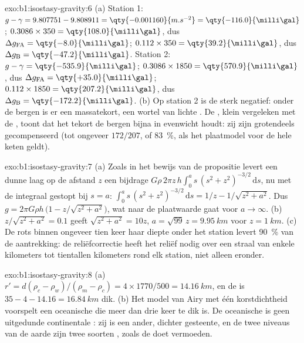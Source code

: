 \begin{solution}{exo:b1:isostasy-gravity:6}
(a) Station 1: $g - \gamma = 9.807751 - 9.808911 = \qty{-0.001160}{m.s^{-2}} =
\qty{-116.0}{\milli\gal}$;  $0.3086\times350 =
\qty{108.0}{\milli\gal}$, dus $\Delta g_{\mathrm{FA}} = \qty{-8.0}{\milli\gal}$;
 $0.112\times350 = \qty{39.2}{\milli\gal}$, dus
$\Delta g_{\mathrm B} = \qty{-47.2}{\milli\gal}$.
Station 2: $g - \gamma = \qty{-535.9}{\milli\gal}$; 
$0.3086\times1850 = \qty{570.9}{\milli\gal}$, dus $\Delta g_{\mathrm{FA}} =
\qty{+35.0}{\milli\gal}$;  $0.112\times1850 =
\qty{207.2}{\milli\gal}$, dus $\Delta g_{\mathrm B} = \qty{-172.2}{\milli\gal}$.
(b) Op station 2 is de  sterk negatief: onder de bergen is er een massatekort, een wortel van lichte . De , klein vergeleken met de , toont dat het tekort de bergen bijna in evenwicht houdt: zij zijn grotendeels gecompenseerd (tot ongeveer $172/207$, of \qty{83}{\percent}, als het plaatmodel voor de hele keten geldt).
\end{solution}

\begin{solution}{exo:b1:isostasy-gravity:7}
(a) Zoals in het bewijs van de propositie levert een dunne laag op de afstand $z$
een bijdrage $G\rho\,2\pi z\,h\int_0^a s\,(s^2 + z^2)^{-3/2}\,\mathrm ds$, nu met de integraal gestopt bij $s = a$:
$\int_0^a s\,(s^2 + z^2)^{-3/2}\,\mathrm ds = 1/z - 1/\sqrt{z^2 + a^2}$. Dus
$g = 2\pi G\rho h\,\bigl(1 - z/\sqrt{z^2 + a^2}\bigr)$, wat naar de plaatwaarde gaat voor $a \to \infty$. (b) $z/\sqrt{z^2 + a^2} = 0.1$ geeft
$\sqrt{z^2 + a^2} = 10z$, $a = \sqrt{99}\,z = \qty{9.95}{km}$ voor
$z = \qty{1}{km}$. (c) De rots binnen ongeveer tien keer haar diepte onder het station levert \qty{90}{\percent} van de aantrekking: de reliëfcorrectie heeft het reliëf nodig over een straal van enkele kilometers tot tientallen kilometers rond elk station, niet alleen eronder.
\end{solution}

\begin{solution}{exo:b1:isostasy-gravity:8}
(a) $r' = d(\rho_c - \rho_w)/(\rho_m - \rho_c) = 4\times1770/500 =
\qty{14.16}{km}$, en de  is $35 - 4 - 14.16 = \qty{16.84}{km}$ dik.
(b) Het model van Airy met één korstdichtheid voorspelt een oceanische  die meer dan drie keer te dik is. De oceanische  is geen uitgedunde continentale : zij is een ander, dichter gesteente, en de twee niveaus van de aarde zijn twee soorten , zoals de  doet vermoeden.
\end{solution}

